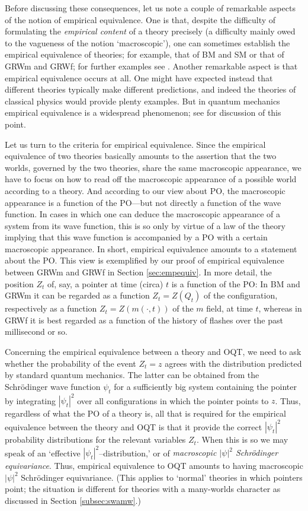 \documentclass[12pt]{article}
\begin{document}
Before discussing these consequences, let us note a couple of remarkable
aspects of the notion of empirical equivalence. One is that, despite the
difficulty of formulating the \emph{empirical content} of a theory
precisely (a difficulty mainly owed to the vagueness of the notion
`macroscopic'), one can sometimes establish the empirical equivalence of
theories; for example, that of {\sf BM} and {\sf SM} or that of {\sf GRWm}
and {\sf GRWf}; for further examples see \citep{aapr}. Another remarkable
aspect is that empirical equivalence occurs at all. One might have expected
instead that different theories typically make different predictions, and
indeed the theories of classical physics would provide plenty examples. But
in quantum mechanics empirical equivalence is a widespread phenomenon; see
\citep{aapr} for discussion of this point.

Let us turn to the criteria for empirical equivalence. Since the empirical
equivalence of two theories basically amounts to the assertion that the two worlds,
governed by the two theories, share the same macroscopic appearance, we have to
focus on how to read off the macroscopic appearance of a possible world
according to a theory. And according to our view about PO, the macroscopic
appearance is a function of the PO---but not directly a function of the
wave function. In cases in which one can deduce the macroscopic appearance
of a system from its wave function, this is so only by virtue of a law of
the theory implying that this wave function is accompanied by a PO with a
certain macroscopic appearance. In short, empirical equivalence amounts to
a statement about the PO. This view is exemplified by our proof of empirical
equivalence between {\sf GRWm} and {\sf GRWf} in Section
\ref{sec:empequiv}. In more detail, the position $Z_t$ of, say, a pointer at time
(circa) $t$ is a function of the PO: In {\sf BM} and {\sf GRWm} it can be
regarded as a function $Z_t = Z(Q_t)$ of the configuration, respectively as
a function $Z_t = Z(m(\cdot,t))$ of the $m$ field, at time $t$, whereas in
{\sf GRWf} it is best regarded as a function of the history of flashes
over the past millisecond or so.

Concerning the empirical equivalence between a theory and {\sf OQT}, we need to
ask whether the probability of the event $Z_t=z$ agrees with the
distribution predicted by standard quantum mechanics.  The latter can be
obtained from the Schr\"odinger wave function $\psi_t$ for a sufficiently
big system containing the pointer by integrating $|\psi_t|^2$ over all
configurations in which the pointer points to $z$.  Thus, regardless of
what the PO of a theory is, all that is required for the empirical
equivalence between the theory and {\sf OQT} is that it provide the correct
$|\psi_t|^2$ probability distributions for the relevant variables $Z_t$.
When this is so we may speak of an `effective
$|\psi_t|^2$--distribution,' or of  \textit{macroscopic
  $|\psi|^2$ Schr\"odinger equivariance}. Thus, empirical equivalence to
{\sf OQT} amounts to having macroscopic $|\psi|^2$ Schr\"odinger
equivariance. (This applies to `normal' theories in which pointers point;
the situation is different for theories with a many-worlds character as
discussed in Section
\ref{subsec:swamw}.)
\end{document}
